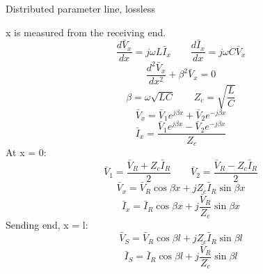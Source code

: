 Distributed parameter line, lossless

x is measured from the receiving end.
$$\frac{d\bar V_x}{dx}=j\omega L\bar I_x\qquad \frac{d\bar I_x}{dx}=j\omega C\bar V_x$$
$$\frac{d^2\bar V_x}{dx^2}+\beta^2\bar V_x=0$$
$$\beta=\omega\sqrt{LC}\qquad Z_c=\sqrt{\frac{L}{C}}$$
$$\bar V_x=\bar V_1e^{j\beta x}+\bar V_2e^{-j\beta x}$$
$$\bar I_x=\frac{\bar V_1e^{j\beta x}-\bar V_2e^{-j\beta x}}{Z_c}$$
At x = 0:
$$\bar V_1=\frac{\bar V_R+Z_c\bar I_R}{2}\qquad \bar V_2=\frac{\bar V_R-Z_c\bar I_R}{2}$$
$$\bar V_x=\bar V_R\cos\beta x+jZ_c\bar I_R\sin\beta x$$
$$\bar I_x=\bar I_R\cos\beta x+j\frac{\bar V_R}{Z_c}\sin\beta x$$
Sending end, x = l:
$$\bar V_S=\bar V_R\cos\beta l+jZ_c\bar I_R\sin\beta l$$
$$\bar I_S=\bar I_R\cos\beta l+j\frac{\bar V_R}{Z_c}\sin\beta l$$
